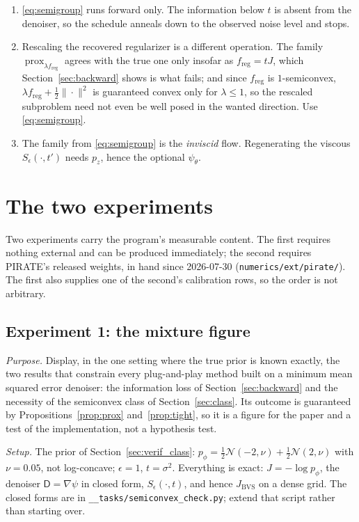 \documentclass[11pt]{article}
\theoremstyle{definition}
\newcommand{\D}{\mathsf{D}}
\newcommand{\freg}{f_{\mathrm{reg}}}
\newcommand{\prox}{\operatorname{prox}}
\newcommand{\code}[1]{\texttt{#1}}
\newcommand{\Jbvs}{J_{\mathrm{BVS}}}
\begin{document}
\begin{enumerate}[leftmargin=2em]
\item \eqref{eq:semigroup} runs forward only. The information below $t$ is absent from the denoiser, so the schedule anneals down to the observed noise level and stops.
\item Rescaling the recovered regularizer is a different operation. The family $\prox_{\lambda\freg}$ agrees with the true one only insofar as $\freg = tJ$, which Section~\ref{sec:backward} shows is what fails; and since $\freg$ is $1$-semiconvex, $\lambda\freg+\tfrac12\|\cdot\|^2$ is guaranteed convex only for $\lambda\le1$, so the rescaled subproblem need not even be well posed in the wanted direction. Use \eqref{eq:semigroup}.
\item The family from \eqref{eq:semigroup} is the \emph{inviscid} flow. Regenerating the viscous $S_\epsilon(\cdot,t')$ needs $p_z$, hence the optional $\psi_\theta$.
\end{enumerate}

\section{The two experiments}
\label{sec:experiments}

Two experiments carry the program's measurable content. The first requires nothing external and can be produced immediately; the second requires PIRATE's released weights, in hand since 2026-07-30 (\code{numerics/ext/pirate/}). The first also supplies one of the second's calibration rows, so the order is not arbitrary.

\subsection{Experiment 1: the mixture figure}
\label{sec:exp1}

\emph{Purpose.} Display, in the one setting where the true prior is known exactly, the two results that constrain every plug-and-play method built on a minimum mean squared error denoiser: the information loss of Section~\ref{sec:backward} and the necessity of the semiconvex class of Section~\ref{sec:class}. Its outcome is guaranteed by Propositions~\ref{prop:prox} and~\ref{prop:tight}, so it is a figure for the paper and a test of the implementation, not a hypothesis test.

\emph{Setup.} The prior of Section~\ref{sec:verif_class}: $p_\phi = \tfrac12\mathcal{N}(-2,\nu) + \tfrac12\mathcal{N}(2,\nu)$ with $\nu = 0.05$, not log-concave; $\epsilon = 1$, $t = \sigma^2$. Everything is exact: $J = -\log p_\phi$, the denoiser $\D = \nabla\psi$ in closed form, $S_\epsilon(\cdot,t)$, and hence $\Jbvs$ on a dense grid. The closed forms are in \code{\_\_tasks/semiconvex\_check.py}; extend that script rather than starting over.
\end{document}
